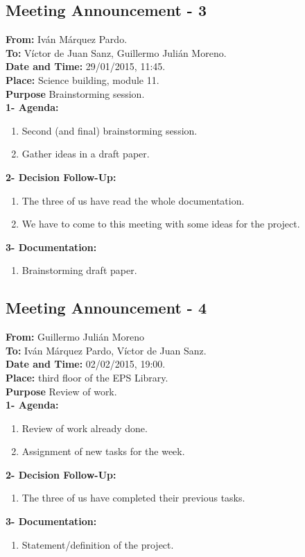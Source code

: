 \subsection{Meeting Announcement - 3}

\textbf{From: } Iván Márquez Pardo.\\
\textbf{To: } Víctor de Juan Sanz, Guillermo Julián Moreno.\\
\textbf{Date and Time: } 29/01/2015, 11:45.\\
\textbf{Place: } Science building, module 11.\\

\textbf{Purpose} Brainstorming session.\\

\textbf{1- Agenda:}
\begin{enumerate}
\item Second (and final) brainstorming session.
\item Gather ideas in a draft paper.
\end{enumerate}
\textbf{2- Decision Follow-Up:} 
\begin{enumerate}
\item The three of us have read the whole documentation.
\item We have to come to this meeting with some ideas for the project.
\end{enumerate}
\textbf{3- Documentation:}
\begin{enumerate}
\item Brainstorming draft paper.
\end{enumerate}


\subsection{Meeting Announcement - 4}

\textbf{From: } Guillermo Julián Moreno\\
\textbf{To: } Iván Márquez Pardo, Víctor de Juan Sanz.\\
\textbf{Date and Time: } 02/02/2015, 19:00.\\
\textbf{Place: } third floor of the EPS Library.\\

\textbf{Purpose} Review of work. \\

\textbf{1- Agenda:}
\begin{enumerate}
\item Review of work already done.
\item Assignment of new tasks for the week.
\end{enumerate}
\textbf{2- Decision Follow-Up:} 
\begin{enumerate}
\item The three of us have completed their previous tasks.
\end{enumerate}
\textbf{3- Documentation:}
\begin{enumerate}
\item Statement/definition of the project.
\end{enumerate}


